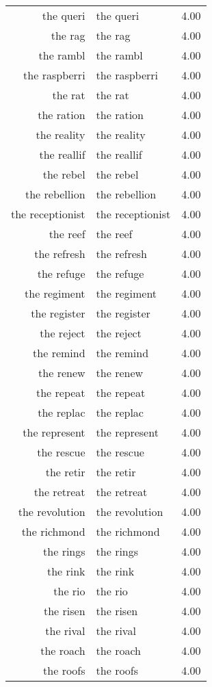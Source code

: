 \begin{table}[ht]
\begin{tabular}{rlr}
  the queri & the queri & 4.00 \\ 
  the rag & the rag & 4.00 \\ 
  the rambl & the rambl & 4.00 \\ 
  the raspberri & the raspberri & 4.00 \\ 
  the rat & the rat & 4.00 \\ 
  the ration & the ration & 4.00 \\ 
  the reality & the reality & 4.00 \\ 
  the reallif & the reallif & 4.00 \\ 
  the rebel & the rebel & 4.00 \\ 
  the rebellion & the rebellion & 4.00 \\ 
  the receptionist & the receptionist & 4.00 \\ 
  the reef & the reef & 4.00 \\ 
  the refresh & the refresh & 4.00 \\ 
  the refuge & the refuge & 4.00 \\ 
  the regiment & the regiment & 4.00 \\ 
  the register & the register & 4.00 \\ 
  the reject & the reject & 4.00 \\ 
  the remind & the remind & 4.00 \\ 
  the renew & the renew & 4.00 \\ 
  the repeat & the repeat & 4.00 \\ 
  the replac & the replac & 4.00 \\ 
  the represent & the represent & 4.00 \\ 
  the rescue & the rescue & 4.00 \\ 
  the retir & the retir & 4.00 \\ 
  the retreat & the retreat & 4.00 \\ 
  the revolution & the revolution & 4.00 \\ 
  the richmond & the richmond & 4.00 \\ 
  the rings & the rings & 4.00 \\ 
  the rink & the rink & 4.00 \\ 
  the rio & the rio & 4.00 \\ 
  the risen & the risen & 4.00 \\ 
  the rival & the rival & 4.00 \\ 
  the roach & the roach & 4.00 \\ 
  the roofs & the roofs & 4.00 \\ 

\end{tabular}
\end{table}
